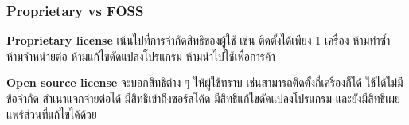 \begin{frame}
  \frametitle{Proprietary vs FOSS}
  \begin{alertblock}{\bfseries Proprietary license }
    เน้นไปที่การจำกัดสิทธิของผู้ใช้ เช่น ติดตั้งได้เพียง 1 เครื่อง ห้ามทำซ้ำ ห้ามจำหน่ายต่อ ห้ามแก้ไขดัดแปลงโปรแกรม ห้ามนำไปใช้เพื่อการค้า
  \end{alertblock}
  \begin{block}{\bfseries Open source license }
    จะบอกสิทธิต่าง ๆ ให้ผู้ใช้ทราบ เช่นสามารถติดตั้งกี่เครื่องก็ได้ ใช้ได้ไม่มีข้อจำกัด สำเนาแจกจ่ายต่อได้ มีสิทธิเข้าถึงซอร์สโค้ด มีสิทธิแก้ไขดัดแปลงโปรแกรม และยังมีสิทธิเผยแพร่ส่วนที่แก้ไขได้ด้วย
  \end{block}
\end{frame}